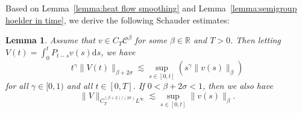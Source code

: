 \documentclass[11pt,a4paper]{article}
\newcommand{\mathd}{\mathrm{d}}
\newtheorem{lemma}[theorem]{Lemma}
\theoremstyle{remark}
\newcommand{\CC}{\ensuremath{\mathscr{C}}}
\begin{document}
Based on Lemma~\ref{lemma:heat flow smoothing} and Lemma~\ref{lemma:semigroup hoelder in time}, we derive the following Schauder estimates:

\begin{lemma}\label{lemma:schauder}
  Assume that $v \in C_{T} \CC^{\beta}$ for some $\beta \in \mathbb{R}$ and $T>0$. Then letting $V ( t ) = \int_{0}^{t} P_{t-s} v ( s ) \mathd s$, we have
  \begin{equation}\label{eq:schauder-heat}
     t^{\gamma} \| V ( t ) \|_{\beta +2 \sigma} \lesssim \sup_{s \in [ 0,t ]} ( s^{\gamma} \| v ( s ) \|_{\beta} )
  \end{equation}
  for all $\gamma \in [ 0,1 )$ and all $t \in [ 0,T ]$. If $0< \beta +2 \sigma <1$, then we also have
  \begin{equation}\label{eq:holder-est-heat}
     \| V \|_{C_{T}^{( \beta +2 ) / ( 2 \sigma )} L^{\infty}} \lesssim \sup_{s \in [ 0,t ]} \| v ( s ) \|_{\beta} .
  \end{equation}
\end{lemma}
\end{document}
